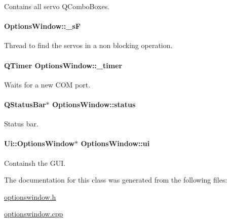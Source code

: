 Contains all servo Q\+Combo\+Boxes. 

\hypertarget{a00006_ab143e1d06250ec778309da1a3807b602}{}
\paragraph[{\+\_\+s\+F}]{ Options\+Window\+::\+\_\+s\+F\hspace{0.3cm}{\ttfamily [private]}}\label{a00006_ab143e1d06250ec778309da1a3807b602}


Thread to find the servos in a non blocking operation. 

\hypertarget{a00006_af6320942b8558140989f552b3bbc1fbd}{}
\paragraph[{\+\_\+timer}]{\setlength{\rightskip}{0pt plus 5cm}Q\+Timer Options\+Window\+::\+\_\+timer\hspace{0.3cm}{\ttfamily [private]}}\label{a00006_af6320942b8558140989f552b3bbc1fbd}


Waits for a new C\+O\+M port. 

\hypertarget{a00006_af031403c7017cf086c0b85186c53471e}{}
\paragraph[{status}]{\setlength{\rightskip}{0pt plus 5cm}Q\+Status\+Bar$\ast$ Options\+Window\+::status\hspace{0.3cm}{\ttfamily [private]}}\label{a00006_af031403c7017cf086c0b85186c53471e}


Status bar. 

\hypertarget{a00006_a8347442d5b3b670e8fff0c4102db1f88}{}
\paragraph[{ui}]{\setlength{\rightskip}{0pt plus 5cm}Ui\+::\+Options\+Window$\ast$ Options\+Window\+::ui\hspace{0.3cm}{\ttfamily [private]}}\label{a00006_a8347442d5b3b670e8fff0c4102db1f88}


Containsh the G\+U\+I. 



The documentation for this class was generated from the following files\+:\begin{DoxyCompactItemize}
\item 
\hyperlink{a00020}{optionswindow.\+h}\item 
\hyperlink{a00019}{optionswindow.\+cpp}\end{DoxyCompactItemize}
